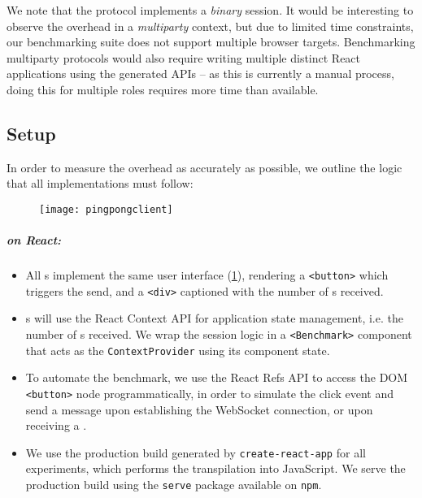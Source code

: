We note that the  protocol 
implements a \textit{binary} session. 
It would be interesting to observe the overhead in a \textit{multiparty}
context, but due to limited time constraints,
our benchmarking suite does not support multiple browser targets.
Benchmarking multiparty protocols would also require writing multiple
distinct React applications using the generated APIs -- as this is currently
a manual process, doing this for multiple roles requires more time than
available.

\subsection{Setup}

In order to measure the overhead as accurately as possible,
we outline the logic that all implementations must follow:

\begin{figure}[!ht]
\centering
\texttt{[image: pingpongclient]}
\label{fig:pingpongclient}
\end{figure}

\subparagraph{  on React:}
\begin{itemize}

\item All s implement the same user interface 
(\cref{fig:pingpongclient}), rendering
a \texttt{<button>} which triggers the send, and
a \texttt{<div>} captioned with the number of s received.

\item {}s will use the React Context API \cite{reactcontext}
for application state management, i.e. the number of s received. 
We wrap the session logic in a \texttt{<Benchmark>} component 
that acts as the \texttt{ContextProvider} using its component state.

\item To automate the benchmark, we use the React Refs API \cite{reactrefs}
to access the DOM \texttt{<button>} node programmatically, in order to
simulate the click event and send a  message upon establishing
the WebSocket connection, or upon receiving a .

\item We use the production build generated by 
\texttt{create-react-app} \cite{cra} for all experiments, which performs the
transpilation into JavaScript. We serve the production build using the
\texttt{serve} package \cite{npmserve} available on \texttt{npm}.

\end{itemize}

